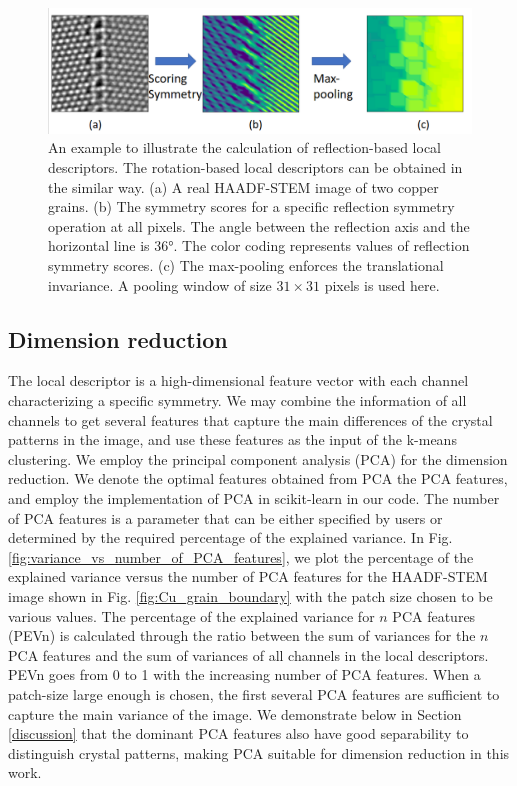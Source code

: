 \documentclass[twocolumn,amsmath, floatfix]{revtex4}
\begin{document}
\begin{figure}[htbp]
\centering
\includegraphics[width=1.\columnwidth]{reflection_descriptors.png}
\caption{An example to illustrate the calculation of reflection-based local descriptors. The rotation-based local descriptors can be obtained in the similar way. (a)  A real HAADF-STEM image of two copper grains. (b) The symmetry scores for a specific reflection symmetry operation at all pixels. The angle between the reflection axis and the horizontal line is \ang{36}.  The color coding represents values of reflection symmetry scores. (c) The max-pooling enforces the translational invariance. A pooling window of size $31\times31$ pixels is used here. }
\label{reflection_local_descriptors}
\end{figure}


\subsection{Dimension reduction}
The local descriptor is a high-dimensional feature vector with each channel characterizing a specific symmetry. We may combine the information of all channels to get several features that capture the main differences of the crystal patterns in the image, and use these features as the input of the k-means clustering. We employ the principal component analysis (PCA) for the dimension reduction. We denote the optimal features obtained from PCA the PCA features, and employ the implementation of PCA in scikit-learn \cite{scikit-learn} in our code. The number of PCA features is a parameter that can be either specified by users or determined by the required percentage of the explained variance. In Fig. \ref{fig:variance_vs_number_of_PCA_features}, we plot the percentage of the explained variance versus the number of PCA features for the HAADF-STEM image shown in Fig. \ref{fig:Cu_grain_boundary} with the patch size chosen to be various values. The percentage of the explained variance for $n$ PCA features (PEVn) is calculated through the ratio between the sum of variances for the $n$ PCA features and the sum of variances of all channels in the local descriptors. PEVn goes from 0 to 1 with the increasing number of PCA features. When a patch-size large enough is chosen, the first several PCA features are sufficient to capture the main variance of the image.  We demonstrate below in Section \ref{discussion} that the dominant PCA features also have good separability to distinguish crystal patterns, making PCA suitable for dimension reduction in this work.
\end{document}
